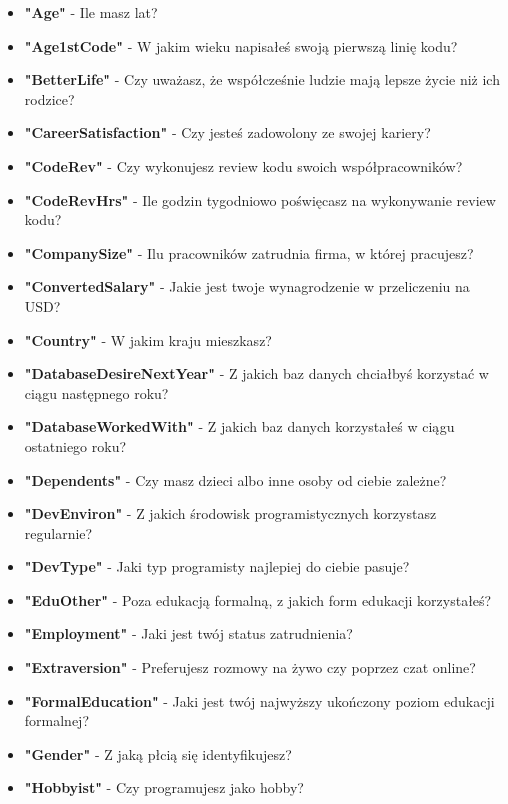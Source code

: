 \begin{appendices}
    \begin{itemize}
        \item \textbf{"Age"} - Ile masz lat?
        \item \textbf{"Age1stCode"} - W jakim wieku napisałeś swoją pierwszą linię kodu?
        \item \textbf{"BetterLife"} - Czy uważasz, że współcześnie ludzie mają lepsze życie niż ich rodzice?
        \item \textbf{"CareerSatisfaction"} - Czy jesteś zadowolony ze swojej kariery?
        \item \textbf{"CodeRev"} - Czy wykonujesz review kodu swoich współpracowników?
        \item \textbf{"CodeRevHrs"} - Ile godzin tygodniowo poświęcasz na wykonywanie review kodu?
        \item \textbf{"CompanySize"} - Ilu pracowników zatrudnia firma, w której pracujesz?
        \item \textbf{"ConvertedSalary"} - Jakie jest twoje wynagrodzenie w przeliczeniu na USD?
        \item \textbf{"Country"} - W jakim kraju mieszkasz?
        \item \textbf{"DatabaseDesireNextYear"} - Z jakich baz danych chciałbyś korzystać w ciągu następnego roku?
        \item \textbf{"DatabaseWorkedWith"} - Z jakich baz danych korzystałeś w ciągu ostatniego roku?
        \item \textbf{"Dependents"} - Czy masz dzieci albo inne osoby od ciebie zależne?
        \item \textbf{"DevEnviron"} - Z jakich środowisk programistycznych korzystasz regularnie?
        \item \textbf{"DevType"} - Jaki typ programisty najlepiej do ciebie pasuje?
        \item \textbf{"EduOther"} - Poza edukacją formalną, z jakich form edukacji korzystałeś?
        \item \textbf{"Employment"} - Jaki jest twój status zatrudnienia?
        \item \textbf{"Extraversion"} - Preferujesz rozmowy na żywo czy poprzez czat online?
        \item \textbf{"FormalEducation"} - Jaki jest twój najwyższy ukończony poziom edukacji formalnej?
        \item \textbf{"Gender"} - Z jaką płcią się identyfikujesz?
        \item \textbf{"Hobbyist"} - Czy programujesz jako hobby?

\end{itemize}
\end{appendices}
